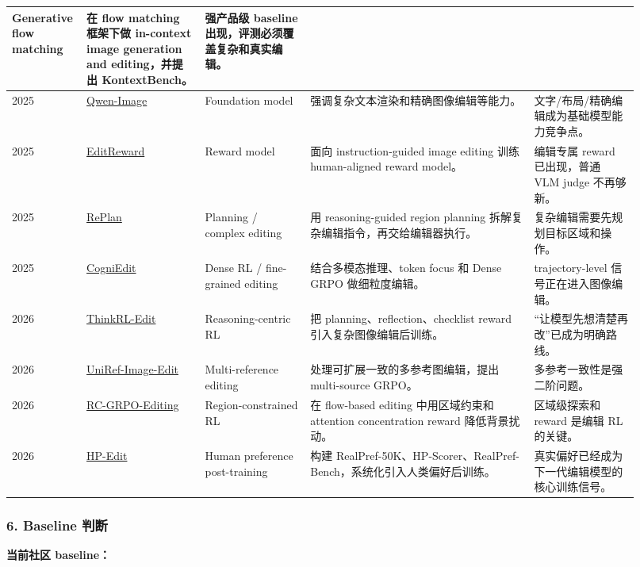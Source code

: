 {\begin{longtable}{p{0.08\linewidth} p{0.18\linewidth} p{0.16\linewidth} p{0.34\linewidth} p{0.16\linewidth}}
Generative flow matching &
在 flow matching 框架下做 in-context image generation and editing，并提出 KontextBench。 &
强产品级 baseline 出现，评测必须覆盖复杂和真实编辑。 \\
\midrule
2025 &
\href{https://arxiv.org/abs/2508.02324}{Qwen-Image} &
Foundation model &
强调复杂文本渲染和精确图像编辑等能力。 &
文字/布局/精确编辑成为基础模型能力竞争点。 \\
\midrule
2025 &
\href{https://arxiv.org/abs/2509.26346}{EditReward} &
Reward model &
面向 instruction-guided image editing 训练 human-aligned reward model。 &
编辑专属 reward 已出现，普通 VLM judge 不再够新。 \\
\midrule
2025 &
\href{https://arxiv.org/abs/2512.16864}{RePlan} &
Planning / complex editing &
用 reasoning-guided region planning 拆解复杂编辑指令，再交给编辑器执行。 &
复杂编辑需要先规划目标区域和操作。 \\
\midrule
2025 &
\href{https://arxiv.org/abs/2512.13276}{CogniEdit} &
Dense RL / fine-grained editing &
结合多模态推理、token focus 和 Dense GRPO 做细粒度编辑。 &
trajectory-level 信号正在进入图像编辑。 \\
\midrule
2026 &
\href{https://arxiv.org/abs/2601.03467}{ThinkRL-Edit} &
Reasoning-centric RL &
把 planning、reflection、checklist reward 引入复杂图像编辑后训练。 &
“让模型先想清楚再改”已成为明确路线。 \\
\midrule
2026 &
\href{https://arxiv.org/abs/2602.14186}{UniRef-Image-Edit} &
Multi-reference editing &
处理可扩展一致的多参考图编辑，提出 multi-source GRPO。 &
多参考一致性是强二阶问题。 \\
\midrule
2026 &
\href{https://arxiv.org/abs/2604.09386}{RC-GRPO-Editing} &
Region-constrained RL &
在 flow-based editing 中用区域约束和 attention concentration reward 降低背景扰动。 &
区域级探索和 reward 是编辑 RL 的关键。 \\
\midrule
2026 &
\href{https://arxiv.org/abs/2604.19406}{HP-Edit} &
Human preference post-training &
构建 RealPref-50K、HP-Scorer、RealPref-Bench，系统化引入人类偏好后训练。 &
真实偏好已经成为下一代编辑模型的核心训练信号。 \\
\bottomrule
\end{longtable}
}

\subsubsection*{6. Baseline 判断}

\textbf{当前社区 baseline：}


